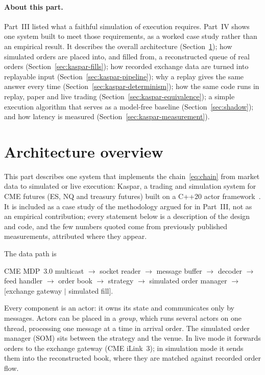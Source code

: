 \paragraph{About this part.} Part~III listed what a faithful simulation of execution requires. Part~IV
shows one system built to meet those requirements, as a worked case study rather than an empirical
result. It describes the overall architecture (Section~\ref{sec:kaspar}); how simulated orders are
placed into, and filled from, a reconstructed queue of real orders (Section~\ref{sec:kaspar-fills});
how recorded exchange data are turned into replayable input (Section~\ref{sec:kaspar-pipeline}); why a
replay gives the same answer every time (Section~\ref{sec:kaspar-determinism}); how the same code runs
in replay, paper and live trading (Section~\ref{sec:kaspar-equivalence}); a simple execution algorithm
that serves as a model-free baseline (Section~\ref{sec:shadow}); and how latency is measured
(Section~\ref{sec:kaspar-measurement}).

\section{Architecture overview}
\label{sec:kaspar}

This part describes one system that implements the chain~\eqref{eq:chain} from market data to
simulated or live execution: Kaspar, a trading and simulation system for CME futures (ES, NQ and
treasury futures) built on a C++20 actor framework~\citep{maciejewski_actor}. It is included as a
case study of the methodology argued for in Part~III, not as an empirical contribution; every
statement below is a description of the design and code, and the few numbers quoted come from
previously published measurements, attributed where they appear.

The data path is
\begin{center}\small
CME MDP~3.0 multicast $\to$ socket reader $\to$ message buffer $\to$ decoder $\to$ feed handler
$\to$ order book $\to$ strategy $\to$ simulated order manager $\to$ [exchange gateway $\mid$ simulated fill].
\end{center}
Every component is an actor: it owns its state and communicates only by messages. Actors can be
placed in a \emph{group}, which runs several actors on one thread, processing one message at a time
in arrival order. The simulated order manager (SOM) sits between the strategy and the venue. In
live mode it forwards orders to the exchange gateway (CME iLink~3); in simulation mode it sends
them into the reconstructed book, where they are matched against recorded order flow.

